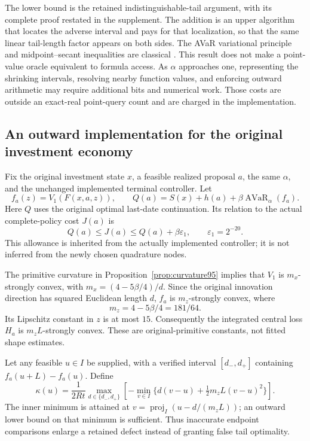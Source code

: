 The lower bound is the retained indistinguishable-tail argument, with
its complete proof restated in the supplement.  The addition is an upper
algorithm that locates the adverse interval and pays for that localization,
so that the same linear tail-length factor appears on both sides.  The
AVaR variational principle and midpoint--secant inequalities are classical
\citep{rockafellaruryasev2002,Novak2015Integration97}.  This result does
not make a point-value oracle equivalent to formula access.  As
$\alpha$ approaches one, representing the shrinking intervals, resolving
nearby function values, and enforcing outward arithmetic may require
additional bits and numerical work.  Those costs are outside an
exact-real point-query count and are charged in the implementation.

\subsection{An outward implementation for the original investment economy}
Fix the original investment state $x$, a feasible realized proposal $a$,
the same $\alpha$, and the unchanged implemented terminal controller.
Let
\[
 f_a(z)=V_1(F(x,a,z)),\qquad
 Q(a)=S(x)+h(a)+\beta\operatorname{AVaR}_\alpha(f_a).
\]
Here $Q$ uses the original optimal last-date continuation.  Its relation
to the actual complete-policy cost $J(a)$ is
\begin{equation}\label{eq:future119}
 Q(a)\le J(a)\le Q(a)+\beta\varepsilon_1,
 \qquad \varepsilon_1=2^{-20}.
\end{equation}
This allowance is inherited from the actually implemented controller;
it is not inferred from the newly chosen quadrature nodes.

The primitive curvature in Proposition~\ref{prop:curvature95} implies
that $V_1$ is $m_x$-strongly convex, with
$m_x=(4-5\beta/4)/d$.  Since the original innovation direction has
squared Euclidean length $d$, $f_a$ is $m_z$-strongly convex, where
\begin{equation}\label{eq:tailcurvature119}
 m_z=4-5\beta/4=181/64.
\end{equation}
Its Lipschitz constant in $z$ is at most $15$.  Consequently the
integrated central loss $H_a$ is $m_zL$-strongly convex.  These are
original-primitive constants, not fitted shape estimates.

Let any feasible $u\in I$ be supplied, with a verified interval
$[d_-,d_+]$ containing $f_a(u+L)-f_a(u)$.  Define
\begin{equation}\label{eq:taildefect119}
 \kappa(u)=\frac{1}{2Rt}
 \max_{d\in\{d_-,d_+\}}
 \left[-\min_{v\in I}
       \{d(v-u)+\tfrac12m_zL(v-u)^2\}\right].
\end{equation}
The inner minimum is attained at
$v=\operatorname{proj}_I(u-d/(m_zL))$; an outward lower bound on
that minimum is sufficient.  Thus inaccurate endpoint comparisons
enlarge a retained defect instead of granting false tail optimality.

